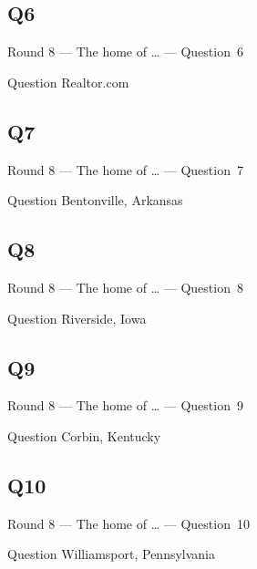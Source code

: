 \documentclass[11pt]{beamer}
\begin{document}
\subsection*{Q6}
\begin{frame}[t]{Round 8 --- The home of \ldots{} --- \mbox{Question 6}}
\vspace{-0.5em}
\begin{block}{Question}
Realtor.com
\end{block}
\end{frame}
\subsection*{Q7}
\begin{frame}[t]{Round 8 --- The home of \ldots{} --- \mbox{Question 7}}
\vspace{-0.5em}
\begin{block}{Question}
Bentonville, Arkansas
\end{block}
\end{frame}
\subsection*{Q8}
\begin{frame}[t]{Round 8 --- The home of \ldots{} --- \mbox{Question 8}}
\vspace{-0.5em}
\begin{block}{Question}
Riverside, Iowa
\end{block}
\end{frame}
\subsection*{Q9}
\begin{frame}[t]{Round 8 --- The home of \ldots{} --- \mbox{Question 9}}
\vspace{-0.5em}
\begin{block}{Question}
Corbin, Kentucky
\end{block}
\end{frame}
\subsection*{Q10}
\begin{frame}[t]{Round 8 --- The home of \ldots{} --- \mbox{Question 10}}
\vspace{-0.5em}
\begin{block}{Question}
Williamsport, Pennsylvania
\end{block}
\end{frame}
\end{document}
